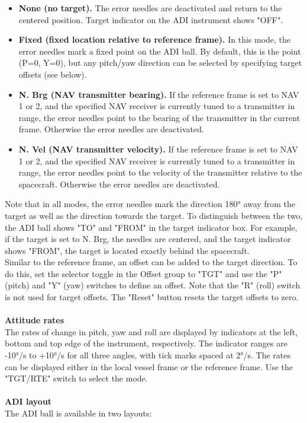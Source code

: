 \documentclass[Orbiter User Manual.tex]{subfiles}
\begin{document}
\begin{itemize} 
\item \textbf{None (no target).} The error needles are deactivated and return to the centered position. Target indicator on the ADI instrument shows "OFF".
\item \textbf{Fixed (fixed location relative to reference frame).} In this mode, the error needles mark a fixed point on the ADI ball. By default, this is the point (P=0, Y=0), but any pitch/yaw direction can be selected by specifying target offsets (see below).
\item \textbf{N. Brg (NAV transmitter bearing).} If the reference frame is set to NAV 1 or 2, and the specified NAV receiver is currently tuned to a transmitter in range, the error needles point to the bearing of the transmitter in the current frame. Otherwise the error needles are deactivated.
\item \textbf{N. Vel (NAV transmitter velocity).} If the reference frame is set to NAV 1 or 2, and the specified NAV receiver is currently tuned to a transmitter in range, the error needles point to the velocity of the transmitter relative to the spacecraft. Otherwise the error needles are deactivated.
\end{itemize}

\noindent
Note that in all modes, the error needles mark the direction 180° away from the target as well as the direction towards the target. To distinguish between the two, the ADI ball shows "TO" and "FROM" in the target indicator box. For example, if the target is set to N. Brg, the needles are centered, and the target indicator shows "FROM", the target is located exactly behind the spacecraft.\\
Similar to the reference frame, an offset can be added to the target direction. To do this, set the selector toggle in the Offset group to "TGT" and use the "P" (pitch) and "Y" (yaw) switches to define an offset. Note that the "R" (roll) switch is not used for target offsets. The "Reset" button resets the target offsets to zero.\\
\\
\textbf{Attitude rates}\\
The rates of change in pitch, yaw and roll are displayed by indicators at the left, bottom and top edge of the instrument, respectively. The indicator ranges are -10°/s to +10°/s for all three angles, with tick marks spaced at 2°/s. The rates can be displayed either in the local vessel frame or the reference frame. Use the "TGT/RTE" switch to select the mode.\\
\\
\textbf{ADI layout}\\
The ADI ball is available in two layouts:
\end{document}
